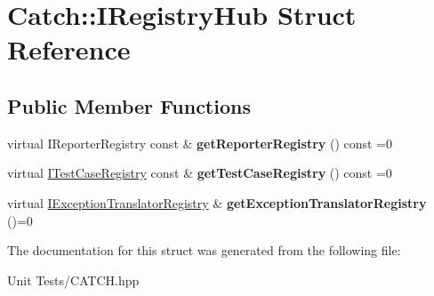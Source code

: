 \hypertarget{structCatch_1_1IRegistryHub}{}\section{Catch\+:\+:I\+Registry\+Hub Struct Reference}
\label{structCatch_1_1IRegistryHub}
\subsection*{Public Member Functions}
\begin{DoxyCompactItemize}
\item 
virtual I\+Reporter\+Registry const \& {\bfseries get\+Reporter\+Registry} () const =0\hypertarget{structCatch_1_1IRegistryHub_a55534563f7ecf7e20ec1e37285ebe54d}{}\label{structCatch_1_1IRegistryHub_a55534563f7ecf7e20ec1e37285ebe54d}

\item 
virtual \hyperlink{structCatch_1_1ITestCaseRegistry}{I\+Test\+Case\+Registry} const \& {\bfseries get\+Test\+Case\+Registry} () const =0\hypertarget{structCatch_1_1IRegistryHub_af4f6255f0c0f8f1f179fa9d7d4843076}{}\label{structCatch_1_1IRegistryHub_af4f6255f0c0f8f1f179fa9d7d4843076}

\item 
virtual \hyperlink{structCatch_1_1IExceptionTranslatorRegistry}{I\+Exception\+Translator\+Registry} \& {\bfseries get\+Exception\+Translator\+Registry} ()=0\hypertarget{structCatch_1_1IRegistryHub_a3606988da110c016c5af3ae63454eb78}{}\label{structCatch_1_1IRegistryHub_a3606988da110c016c5af3ae63454eb78}

\end{DoxyCompactItemize}


The documentation for this struct was generated from the following file\+:\begin{DoxyCompactItemize}
\item 
Unit Tests/C\+A\+T\+C\+H.\+hpp\end{DoxyCompactItemize}
